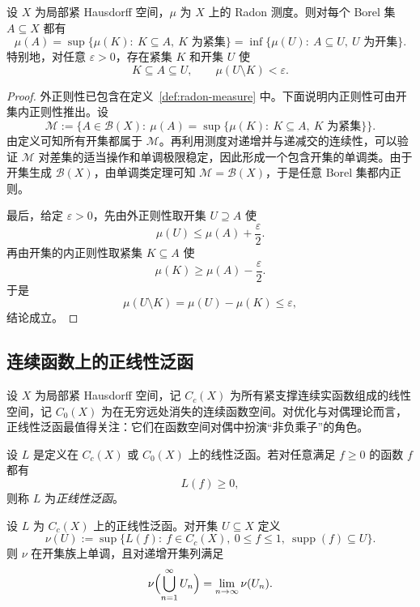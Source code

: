 \begin{proposition}\label{prop:radon-regularity}
设 $X$ 为局部紧 Hausdorff 空间，$\mu$ 为 $X$ 上的 Radon 测度。则对每个 Borel 集 $A\subseteq X$ 都有
\[
\mu(A)=\sup\{\mu(K):\ K\subseteq A,\ K\text{ 为紧集}\}
=\inf\{\mu(U):\ A\subseteq U,\ U\text{ 为开集}\}.
\]
特别地，对任意 $\varepsilon>0$，存在紧集 $K$ 和开集 $U$ 使
\[
K\subseteq A\subseteq U,\qquad \mu(U\setminus K)<\varepsilon.
\]
\end{proposition}

\begin{proof}
外正则性已包含在定义~\ref{def:radon-measure} 中。下面说明内正则性可由开集内正则性推出。设
\[
\mathscr M:=\bigl\{A\in \mathcal B(X):\ \mu(A)=\sup\{\mu(K):\ K\subseteq A,\ K\text{ 为紧集}\}\bigr\}.
\]
由定义可知所有开集都属于 $\mathscr M$。再利用测度对递增并与递减交的连续性，可以验证 $\mathscr M$ 对差集的适当操作和单调极限稳定，因此形成一个包含开集的单调类。由于开集生成 $\mathcal B(X)$，由单调类定理可知 $\mathscr M=\mathcal B(X)$，于是任意 Borel 集都内正则。

最后，给定 $\varepsilon>0$，先由外正则性取开集 $U\supseteq A$ 使
\[
\mu(U)\le \mu(A)+\frac{\varepsilon}{2}.
\]
再由开集的内正则性取紧集 $K\subseteq A$ 使
\[
\mu(K)\ge \mu(A)-\frac{\varepsilon}{2}.
\]
于是
\[
\mu(U\setminus K)=\mu(U)-\mu(K)\le \varepsilon,
\]
结论成立。
\end{proof}

\subsection{连续函数上的正线性泛函}

设 $X$ 为局部紧 Hausdorff 空间，记 $C_c(X)$ 为所有紧支撑连续实函数组成的线性空间，记 $C_0(X)$ 为在无穷远处消失的连续函数空间。对优化与对偶理论而言，正线性泛函最值得关注：它们在函数空间对偶中扮演“非负乘子”的角色。

\begin{definition}[正线性泛函]
设 $L$ 是定义在 $C_c(X)$ 或 $C_0(X)$ 上的线性泛函。若对任意满足 $f\ge 0$ 的函数 $f$ 都有
\[
L(f)\ge 0,
\]
则称 $L$ 为\emph{正线性泛函}。
\end{definition}

\begin{lemma}[由正泛函诱导的集合函数]\label{lem:positive-functional-contents}
设 $L$ 为 $C_c(X)$ 上的正线性泛函。对开集 $U\subseteq X$ 定义
\[
\nu(U):=\sup\{L(f):\ f\in C_c(X),\ 0\le f\le 1,\ \operatorname{supp}(f)\subseteq U\}.
\]
则 $\nu$ 在开集族上单调，且对递增开集列满足
\[
\nu\Bigl(\bigcup_{n=1}^{\infty}U_n\Bigr)=\lim_{n\to\infty}\nu(U_n).
\]
\end{lemma}

